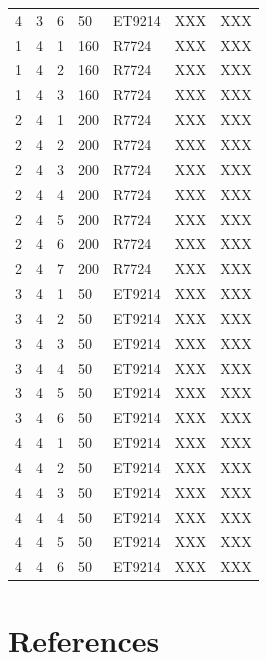 \documentclass[review]{elsarticle}
\begin{document}
\begin{longtable}{  m{3em} | m{3em} | m{5em} | m{3em} | m{3em} | m{3em} | m{8em} }
4	&3	&6	&50	&ET9214	&XXX	&XXX\\ 
1	&4	&1	&160	&R7724	&XXX	&XXX\\ 
1	&4	&2	&160	&R7724	&XXX	&XXX\\ 
1	&4	&3	&160	&R7724	&XXX	&XXX\\ 
2	&4	&1	&200	&R7724	&XXX	&XXX\\ 
2	&4	&2	&200	&R7724	&XXX	&XXX\\ 
2	&4	&3	&200	&R7724	&XXX	&XXX\\ 
2	&4	&4	&200	&R7724	&XXX	&XXX\\ 
2	&4	&5	&200	&R7724	&XXX	&XXX\\ 
2	&4	&6	&200	&R7724	&XXX	&XXX\\ 
2	&4	&7	&200	&R7724	&XXX	&XXX\\ 
3	&4	&1	&50	&ET9214	&XXX	&XXX\\ 
3	&4	&2	&50	&ET9214	&XXX	&XXX\\ 
3	&4	&3	&50	&ET9214	&XXX	&XXX\\ 
3	&4	&4	&50	&ET9214	&XXX	&XXX\\ 
3	&4	&5	&50	&ET9214	&XXX	&XXX\\ 
3	&4	&6	&50	&ET9214	&XXX	&XXX\\ 
4	&4	&1	&50	&ET9214	&XXX	&XXX\\ 
4	&4	&2	&50	&ET9214	&XXX	&XXX\\ 
4	&4	&3	&50	&ET9214	&XXX	&XXX\\ 
4	&4	&4	&50	&ET9214	&XXX	&XXX\\ 
4	&4	&5	&50	&ET9214	&XXX	&XXX\\ 
4	&4	&6	&50	&ET9214	&XXX	&XXX\\ 
		\hline
	\end{longtable}




\section*{References}


\end{document}
